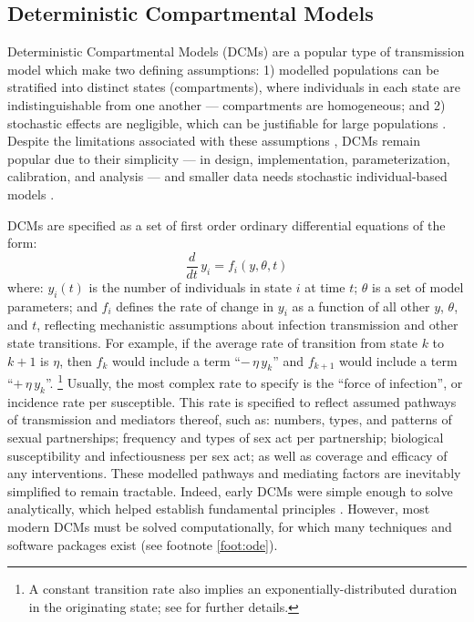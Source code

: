 \subsection{Deterministic Compartmental Models}\label{intro.model.dcm}
Deterministic Compartmental Models (DCMs) are
a popular type of transmission model which make two defining assumptions:
1) modelled populations can be stratified into distinct states (compartments), where
   individuals in each state are indistinguishable from one another
   --- \ie compartments are homogeneous; and
2) stochastic effects are negligible,
   which can be justifiable for large populations \cite{Isham1988}.
Despite the limitations associated with these assumptions \cite{Liljeros2003,Johnson2016mf},
DCMs remain popular due to their simplicity
--- in design, implementation, parameterization, calibration, and analysis ---
and smaller data needs \vs stochastic individual-based models \cite{Garnett2011,Johnson2016mf}.
\par %
DCMs are specified as a set of first order ordinary differential equations of the form:
\begin{equation}
  \frac{d}{dt}\,y_i = f_i(y,\theta,t)
\end{equation} where:
$y_i(t)$ is the number of individuals in state $i$ at time $t$;
$\theta$ is a set of model parameters; and
$f_i$ defines the rate of change in $y_i$ as a function of all other $y$, $\theta$, and $t$,
reflecting mechanistic assumptions about infection transmission and other state transitions.
For example, if the average rate of transition from state $k$ to $k+1$ is $\eta$,
then $f_k$ would include a term ``$-\,\eta\,y_k$''
and $f_{k+1}$ would include a term ``$+\,\eta\,y_k$''.%
\footnote{A constant transition rate also implies an exponentially-distributed duration
  in the originating state; see  for further details.}
Usually, the most complex rate to specify is
the ``force of infection'', or incidence rate per susceptible.
This rate is specified to reflect assumed pathways of transmission and mediators thereof, such as:
numbers, types, and patterns of sexual partnerships;
frequency and types of sex act per partnership;
biological susceptibility and infectiousness per sex act; as well as
coverage and efficacy of any interventions.
These modelled pathways and mediating factors are inevitably simplified to remain tractable.
Indeed, early DCMs were simple enough to solve analytically,
which helped establish fundamental principles \cite{Hethcote2000}.
However, most modern DCMs must be solved computationally,
for which many techniques and software packages exist (\eg see footnote \ref{foot:ode}).
